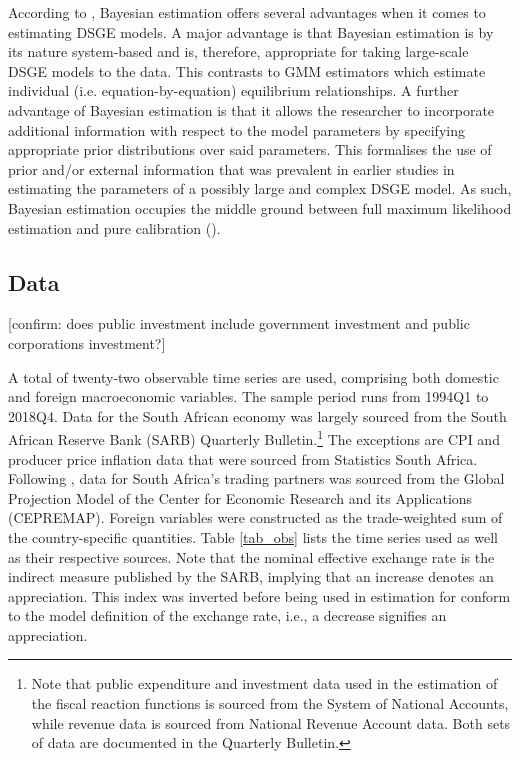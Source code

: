 \documentclass[a4paper,11pt]{article}
\numberwithin{equation}{section}
\begin{document}
	According to \cite{an2007}, Bayesian estimation offers several advantages when it comes to estimating DSGE models. A major advantage is that Bayesian estimation is by its nature system-based and is, therefore, appropriate for taking large-scale DSGE models to the data. This contrasts to GMM estimators which estimate individual (i.e. equation-by-equation) equilibrium relationships. A further advantage of Bayesian estimation is that it allows the researcher to incorporate additional information with respect to the model parameters by specifying appropriate prior distributions over said parameters. This formalises the use of prior and/or external information that was prevalent in earlier studies in estimating the parameters of a possibly large and complex DSGE model. As such, Bayesian estimation occupies the middle ground between full maximum likelihood estimation and pure calibration (\citealp{steinbach2014}).
	
	\subsection{Data}
	
	{\color{red}[confirm: does public investment include government investment and public corporations investment?]}
	
	A total of twenty-two observable time series are used, comprising both domestic and foreign macroeconomic variables. The sample period runs from 1994Q1 to 2018Q4. Data for the South African economy was largely sourced from the South African Reserve Bank (SARB) Quarterly Bulletin.\footnote{Note that public expenditure and investment data used in the estimation of the fiscal reaction functions is sourced from the System of National Accounts, while revenue data is sourced from National Revenue Account data. Both sets of data are documented in the Quarterly Bulletin.} The exceptions are CPI and producer price inflation data that were sourced from Statistics South Africa. Following \cite{steinbach2014}, data for South Africa's trading partners was sourced from the Global Projection Model of the Center for Economic Research and its Applications (CEPREMAP). Foreign variables were constructed as the trade-weighted sum of the country-specific quantities. Table \ref{tab_obs} lists the time series used as well as their respective sources. Note that the nominal effective exchange rate is the indirect measure published by the SARB, implying that an increase denotes an appreciation. This index was inverted before being used in estimation for conform to the model definition of the exchange rate, i.e., a decrease signifies an appreciation.
	
\end{document}
